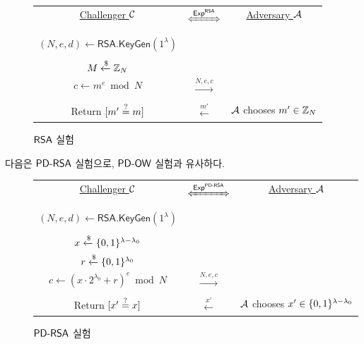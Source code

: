 \begin{figure}[ht]
    \begin{tcolorbox}[colback=white]
        \centering
        \begin{tabularx}{\linewidth}{CcC}
            \underline{Challenger $\mathcal{C}$} & $\xLeftrightarrow{\EXP^{\RSA}}$ & \underline{Adversary $\mathcal{A}$} \\
            \\
            $(N, e, d) \gets \textsf{RSA.KeyGen}(1^{\lambda})$ & & \\
            \\
            $M \xleftarrow{\$} \mathbb{Z}_N$ & & \\
            $c \gets m^e \bmod N$ & $\xrightarrow{N, e, c}$ & \\
            \\
            Return $[m' \overset{?}{=} m]$ & $\xleftarrow{m'}$ & $\mathcal{A}$ chooses $m' \in \mathbb{Z}_N$ \\
        \end{tabularx}
    \end{tcolorbox}
    \caption{$\textsf{RSA}$ 실험}
    \label{fig:rsa-problem}
\end{figure}

다음은 $\textsf{PD-RSA}$ 실험으로, $\textsf{PD-OW}$ 실험과 유사하다.

\begin{figure}[ht]
    \begin{tcolorbox}[colback=white]
        \centering
        \begin{tabularx}{\linewidth}{CcC}
            \underline{Challenger $\mathcal{C}$} & $\xLeftrightarrow{\EXP^{\PDRSA}}$ & \underline{Adversary $\mathcal{A}$} \\
            \\
            $(N, e, d) \gets \textsf{RSA.KeyGen}(1^{\lambda})$ & & \\
            \\
            $x \xleftarrow{\$} \{0, 1\}^{\lambda - \lambda_0}$ & & \\
            $r \xleftarrow{\$} \{0, 1\}^{\lambda_0}$ & & \\
            $c \gets (x \cdot 2^{\lambda_0} + r)^e \bmod N$ & $\xrightarrow{N, e, c}$ & \\
            \\
            Return $[x' \overset{?}{=} x]$ & $\xleftarrow{x'}$ & $\mathcal{A}$ chooses $x' \in \{0, 1\}^{\lambda - \lambda_0}$ \\
        \end{tabularx}
    \end{tcolorbox}
    \caption{$\textsf{PD-RSA}$ 실험}
    \label{fig:pdrsa-problem}
\end{figure}

